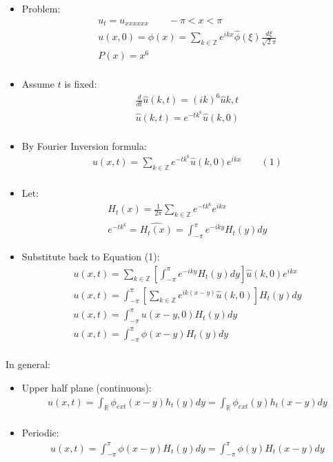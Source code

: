 \documentclass[12pt, a4paper]{article}
\begin{document}
\begin{itemize}
    \item Problem:
    \begin{gather*}
        u_t = u_{xxxxxx} \qquad -\pi < x < \pi\\
        u(x, 0) = \phi(x) = \sum_{k \in \mathbb{Z}} e^{ikx}\hat{\phi}(\xi)\frac{d\xi}{\sqrt{2}\pi}\\
        P(x) = x^6\\
    \end{gather*}
    \item Assume $t$ is fixed:
    \begin{gather*}
        \frac{d}{dt} \hat{u}(k, t) =(ik)^6\hat{u}{k, t} \\
        \hat{u}(k, t) = e^{-tk^6}\hat{u}(k, 0) \\
    \end{gather*}
    \item By Fourier Inversion formula:
    \begin{gather*}
        u(x, t) = \sum_{k \in \mathbb{Z}} e^{-tk^6}\hat{u}(k, 0)e^{ikx} \qquad (1)\\
    \end{gather*}
    \item Let:
    \begin{gather*}
        H_t(x) = \frac{1}{2\pi}\sum_{k \in  \mathbb{Z}} e^{-tk^6}e^{ikx}\\
        e^{-tk^6} = \hat{H_t(x)} = \int_{-\pi}^{\pi}e^{-iky}H_t(y)dy
    \end{gather*}
    \item Substitute back to Equation (1):
    \begin{gather*}
        u(x, t) = \sum_{k \in \mathbb{Z}} \left[\int_{-\pi}^{\pi}e^{-iky}H_t(y)dy\right]\hat{u}(k, 0)e^{ikx}\\ 
        u(x, t) = \int_{-\pi}^{\pi}\left[\sum_{k \in \mathbb{Z}} e^{ik(x-y)}\hat{u}(k, 0)\right]H_t(y)dy\\
        u(x, t) = \int_{-\pi}^{\pi}u(x-y, 0)H_t(y)dy\\
        u(x, t) = \int_{-\pi}^{\pi}\phi(x-y)H_t(y)dy\\
    \end{gather*}
\end{itemize}
In general:
\begin{itemize}
    \item Upper half plane (continuous):
    \begin{gather*}
        u(x, t) = \int_{\mathbb{R}} \phi_{ext}(x-y) h_t(y)dy = \int_{\mathbb{R}} \phi_{ext}(y) h_t(x-y)dy\\
    \end{gather*}
    \item Periodic:
    \begin{gather*}
        u(x, t) = \int_{-\pi}^{\pi}\phi(x-y)H_t(y)dy = \int_{-\pi}^{\pi}\phi(y)H_t(x-y)dy\\
    \end{gather*}
\end{itemize}
\end{document}
